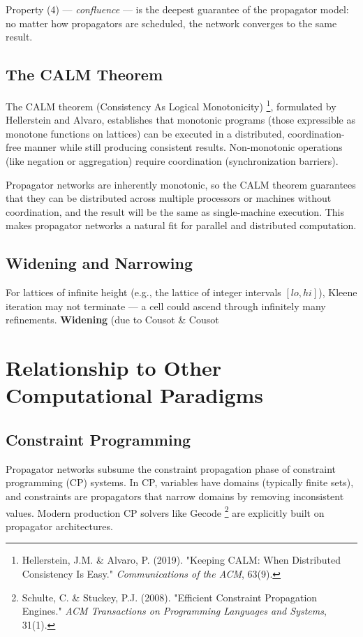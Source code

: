 \documentclass[11pt]{article}
\begin{document}
Property (4) --- \emph{confluence} --- is the deepest guarantee of the
propagator model: no matter how propagators are scheduled, the network
converges to the same result.
\subsection{The CALM Theorem}
\label{sec:org526044c}

The CALM theorem (Consistency As Logical Monotonicity) \footnote{Hellerstein, J.M. \& Alvaro, P. (2019). "Keeping CALM:
When Distributed Consistency Is Easy." \emph{Communications of the ACM},
63(9).\label{orge067b9c}},
formulated by Hellerstein and Alvaro, establishes that monotonic
programs (those expressible as monotone functions on lattices) can be
executed in a distributed, coordination-free manner while still
producing consistent results. Non-monotonic operations (like negation or
aggregation) require coordination (synchronization barriers).

Propagator networks are inherently monotonic, so the CALM theorem
guarantees that they can be distributed across multiple processors or
machines without coordination, and the result will be the same as
single-machine execution. This makes propagator networks a natural fit
for parallel and distributed computation.
\subsection{Widening and Narrowing}
\label{sec:orgddf2bf4}

For lattices of infinite height (e.g., the lattice of integer intervals
\([lo, hi]\)), Kleene iteration may not terminate --- a cell could ascend
through infinitely many refinements. \textbf{Widening} (due to Cousot \& Cousot
\section{Relationship to Other Computational Paradigms}
\label{sec:org28167ef}

\subsection{Constraint Programming}
\label{sec:orgea00c65}

Propagator networks subsume the constraint propagation phase of
constraint programming (CP) systems. In CP, variables have domains
(typically finite sets), and constraints are propagators that narrow
domains by removing inconsistent values. Modern production CP solvers
like Gecode \footnote{Schulte, C. \& Stuckey, P.J. (2008). "Efficient Constraint
Propagation Engines." \emph{ACM Transactions on Programming Languages and
Systems}, 31(1).\label{org4786136}} are explicitly built on propagator architectures.
\end{document}
